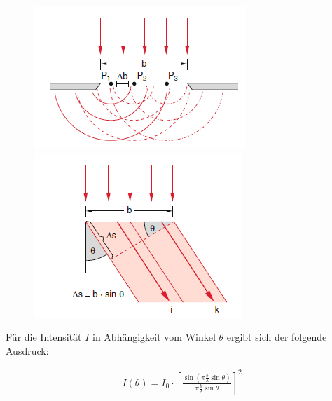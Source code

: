 \documentclass[a4paper, 11pt, ngerman, parskip=half-]{scrartcl}
\begin{document}
\begin{figure}[H]
    \begin{minipage}{.47\textwidth}
        \centering
        \includegraphics[width=0.9\linewidth]{image/19/2.1}

    \end{minipage}%
    \hfill%
    \begin{minipage}{.47\textwidth}
        \centering
        \includegraphics[width=0.92\linewidth]{image/19/2.2}
    \end{minipage}
\end{figure}

Für die Intensität $I$ in Abhängigkeit vom Winkel $\theta$ ergibt sich der folgende Ausdruck:

\begin{align*}
    I(\theta) = I_0 \cdot \left[ \frac{\sin(\pi \frac{b}{\lambda} \sin \theta)}{\pi \frac{b}{\lambda} \sin \theta} \right]^2
\end{align*}
\end{document}
